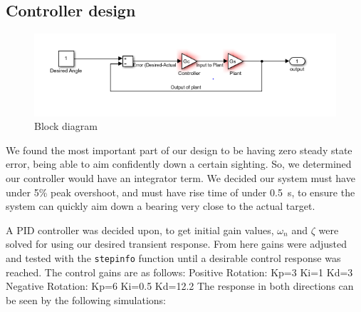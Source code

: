 ﻿\subsection{Controller design}

\begin{figure}
    \begin{center}  
    \includegraphics[width=\columnwidth]{block-diagram.png}    
    \end{center}
    \caption{Block diagram}
    \label{fig:controller1}
\end{figure}

We found the most important part of our design to be having zero steady state error, being able to aim confidently down a certain sighting. So, we determined our controller would have an integrator term. We decided our system must have under 5\% peak overshoot, and must have rise time of under \SI{0.5}{\second}, to ensure the system can quickly aim down a bearing very close to the actual target.

A PID controller was decided upon, to get initial gain values, $\omega_n$ and $\zeta$ were solved for using our desired transient response. From here gains were adjusted and tested with the \lstinline{stepinfo} function until a desirable control response was reached. The control gains are as follows:
Positive Rotation: Kp=3 Ki=1   Kd=3
Negative Rotation: Kp=6 Ki=0.5 Kd=12.2
The response in both directions can be seen by the following simulations:
